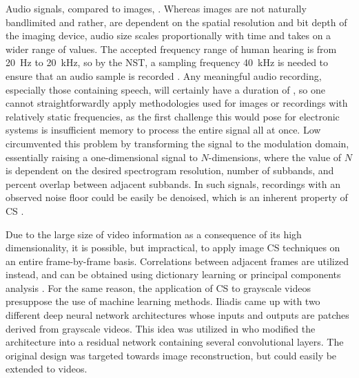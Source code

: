 Audio signals, compared to images, . Whereas images are not naturally bandlimited and rather, are dependent on the spatial resolution and bit depth of the imaging device, audio size scales proportionally with time and takes on a wider range of values. The accepted frequency range of human hearing is from 20~Hz to 20~kHz, so by the NST, a sampling frequency  40~kHz is needed to ensure that an audio sample is recorded . Any meaningful audio recording, especially those containing speech, will certainly have a duration of , so one cannot straightforwardly apply methodologies used for images or recordings with relatively static frequencies, as the first challenge this would pose for electronic systems is insufficient memory to process the entire signal all at once. Low \cite{Low2013,Low2018} circumvented this problem by transforming the signal to the modulation domain,  essentially raising a one-dimensional signal to $N$-dimensions, where the value of $N$ is dependent on the desired spectrogram resolution, number of subbands, and percent overlap between adjacent subbands. In such signals, recordings with an observed noise floor could be easily be denoised, which is an inherent property of CS \cite{Dabov2007}.

Due to the large size of video information as a consequence of its high dimensionality, it is possible, but impractical, to apply image CS techniques on an entire frame-by-frame basis. Correlations between adjacent frames are utilized instead, and can be obtained using dictionary learning \cite{Liu2013} or principal components analysis \cite{Liu2014}. For the same reason, the application of CS to grayscale videos presuppose the use of machine learning methods. Iliadis \cite{Iliadis2018,Iliadis2020} came up with two different deep neural network architectures whose inputs and outputs are patches derived from grayscale videos. This idea was utilized in \cite{Yao2019} who modified the architecture into a residual network containing several convolutional layers. The original design was targeted towards image reconstruction, but could easily be extended to videos.



